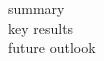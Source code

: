 
\label{sec:conclusion}

\begin{description}
\item[summary]
\item[key results]
\item[future outlook]
\end{description}
